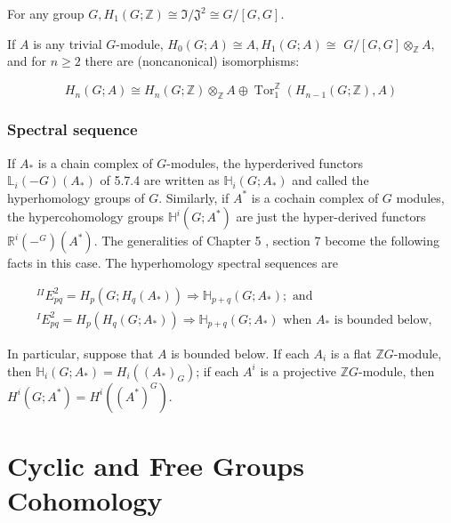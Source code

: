 
\begin{theo}[$H_1$]
For any group $G, H_1(G ; \mathbb{Z}) \cong \mathfrak{I} / \mathfrak{J}^2 \cong G /[G, G]$.   
\end{theo}

\begin{theo}
If $A$ is any trivial $G$-module, $H_0(G ; A) \cong A, H_1(G ; A) \cong$ $G /[G, G] \otimes_{\mathbb{Z}} A$, and for $n \geq 2$ there are (noncanonical) isomorphisms:

$$
H_n(G ; A) \cong H_n(G ; \mathbb{Z}) \otimes_{\mathbb{Z}} A \oplus \operatorname{Tor}_1^{\mathbb{Z}}\left(H_{n-1}(G ; \mathbb{Z}), A\right)
$$
\end{theo}


\subsubsection*{Spectral sequence}

If $A_*$ is a chain complex of $G$-modules, the hyperderived functors $\mathbb{L}_i(-G)\left(A_*\right)$ of 5.7.4 are written as $\mathbb{H}_i\left(G ; A_*\right)$ and called the hyperhomology groups of $G$. Similarly, if $A^*$ is a cochain complex of $G$ modules, the hypercohomology groups $\mathbb{H}^i\left(G ; A^*\right)$ are just the hyper-derived functors $\mathbb{R}^i\left(-{ }^G\right)\left(A^*\right)$. The generalities of Chapter 5 , section 7 become the following facts in this case. The hyperhomology spectral sequences are

$$
\begin{aligned}
& { }^{I I} E_{p q}^2=H_p\left(G ; H_q\left(A_*\right)\right) \Rightarrow \mathbb{H}_{p+q}\left(G ; A_*\right) ; \text { and } \\
& { }^I E_{p q}^2=H_p\left(H_q\left(G ; A_*\right)\right) \Rightarrow \mathbb{H}_{p+q}\left(G ; A_*\right) \text { when } A_* \text { is bounded below, }
\end{aligned}
$$

In particular, suppose that $A$ is bounded below. If each $A_i$ is a flat $\mathbb{Z} G$-module, then $\mathbb{H}_i\left(G ; A_*\right)=H_i\left(\left(A_*\right)_G\right)$; if each $A^i$ is a projective $\mathbb{Z} G$-module, then $H^i\left(G ; A^*\right)=H^i\left(\left(A^*\right)^G\right)$.


\section{Cyclic and Free Groups Cohomology}


